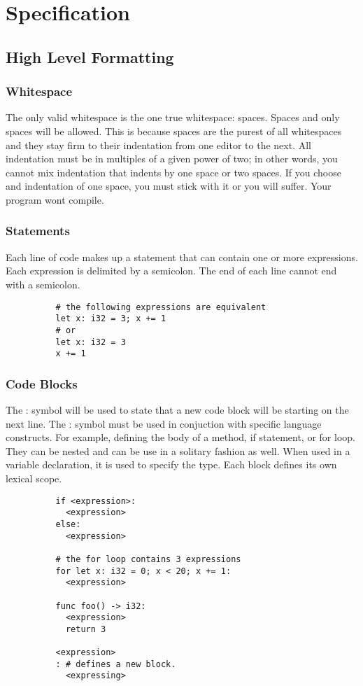 \documentclass{article}
\newcommand{\centersec}[1]{\section*{\hfil #1 \hfil}}
\newcommand{\subcentersec}[1]{\subsection*{\hfil #1 \hfil}}
\newcommand{\subsubcentersec}[1]{\subsubsection*{\hfil #1 \hfil}}
\begin{document}
  \centersec{Specification}
    \subcentersec{High Level Formatting}
      \subsubcentersec{Whitespace}
        The only valid whitespace is the one true whitespace: spaces. Spaces and only spaces will be allowed.
        This is because spaces are the purest of all whitespaces and they stay firm to their indentation
        from one editor to the next. All indentation must be in multiples of a given power of two; in other words,
        you cannot mix indentation that indents by one space or two spaces. If you choose and indentation of
        one space, you must stick with it or you will suffer. Your program wont compile.

      \subsubcentersec{Statements}
        Each line of code makes up a statement that can contain one or more expressions. Each
        expression is delimited by a semicolon. The end of each line cannot end with a semicolon.
        \begin{verbatim}
          # the following expressions are equivalent
          let x: i32 = 3; x += 1
          # or
          let x: i32 = 3
          x += 1
        \end{verbatim}

      \subsubcentersec{Code Blocks}
        The : symbol will be used to state that a new code block will be starting on the next line. The
        : symbol must be used in conjuction with specific language constructs. For example, defining the
        body of a method, if statement, or for loop. They can be nested and can be use in a solitary
        fashion as well. When used in a variable declaration, it is used to specify the type.
        Each block defines its own lexical scope.
        \begin{verbatim}
          if <expression>:
            <expression>
          else:
            <expression>

          # the for loop contains 3 expressions
          for let x: i32 = 0; x < 20; x += 1:
            <expression>

          func foo() -> i32:
            <expression>
            return 3

          <expression>
          : # defines a new block.
            <expressing>
        \end{verbatim}
\end{document}
